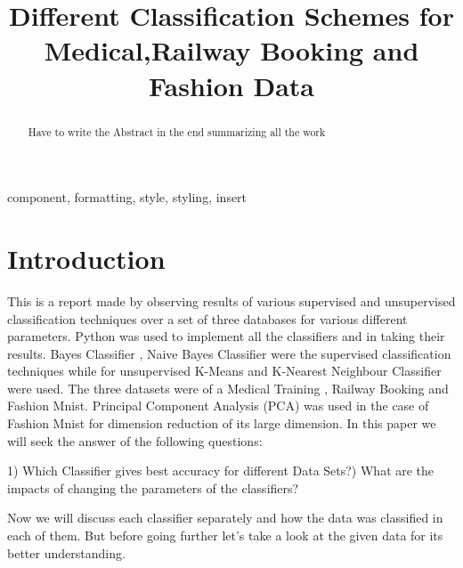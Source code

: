 \documentclass[conference]{IEEEtran}
\begin{document}
    
    \title{Different Classification Schemes for Medical,Railway Booking and Fashion Data\\}
    
    \author{
    \and
    \and
    }
    
    \maketitle
    
    \begin{abstract}
    Have to write the Abstract in the end summarizing all the work
    \end{abstract}
    
    \begin{IEEEkeywords}
    component, formatting, style, styling, insert
    \end{IEEEkeywords}
    
    \section{Introduction}
    This is a report made by observing results of various supervised and unsupervised classification techniques over a set of three databases for various different parameters. Python was used to implement all the classifiers and in taking their results. Bayes Classifier , Naive Bayes Classifier were the supervised classification techniques while for unsupervised K-Means and K-Nearest Neighbour Classifier were used. The three datasets were of a Medical Training , Railway Booking and Fashion Mnist. Principal Component Analysis (PCA) was used in the case of Fashion Mnist for dimension reduction of its large dimension. In this paper we will seek the answer of the following questions:
    \begin{mdframed}
        1) Which Classifier gives best accuracy for different Data Sets?) What are the impacts of changing the parameters of the classifiers?
    \end{mdframed}
    Now we will discuss each classifier separately and how the data was classified in each of them. But before going further let's take a look at the given data for its better understanding.
\end{document}
